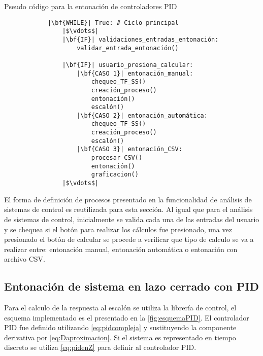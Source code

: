     \begin{longlisting}
        \caption{Pseudo código para la entonación de controladores PID}
        \label{code:entonacion}				
        \begin{verbatim}
            |\bf{WHILE}| True: # Ciclo principal
                |$\vdots$|
                |\bf{IF}| validaciones_entradas_entonación:
                    validar_entrada_entonación()
                
                |\bf{IF}| usuario_presiona_calcular:
                    |\bf{CASO 1}| entonación_manual:
                        chequeo_TF_SS()
                        creación_proceso()
                        entonación()
                        escalón()
                    |\bf{CASO 2}| entonación_automática:
                        chequeo_TF_SS()
                        creación_proceso()
                        escalón()
                    |\bf{CASO 3}| entonación_CSV:
                        procesar_CSV()
                        entonación()
                        graficacion()
                |$\vdots$|
        \end{verbatim}
    \end{longlisting}

    El forma de definición de procesos presentado en la funcionalidad de análisis de sistemas de control es reutilizada para esta sección. Al igual que para el análisis de sistemas de control, inicialmente se valida cada una de las entradas del usuario y se chequea si el botón para realizar los cálculos fue presionado, una vez presionado el botón de calcular se procede a verificar que tipo de calculo se va a realizar entre: entonación manual, entonación automática o entonación con archivo CSV.

    \subsection{Entonación de sistema en lazo cerrado con PID}
        
        Para el calculo de la respuesta al escalón se utiliza la librería de control, el esquema implementado es el presentado en la \cref{fig:esquemaPID}. El controlador PID fue definido utilizando \cref{eq:pidcompleja} y sustituyendo la componente derivativa por \cref{eq:Daproximacion}. Si el sistema es representado en tiempo discreto se utiliza \cref{eq:pidenZ} para definir al controlador PID.
        
